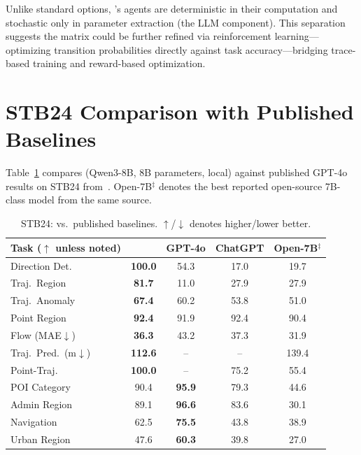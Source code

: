 Unlike standard options, \starname{}'s agents are deterministic in their computation and stochastic only in parameter extraction (the LLM component).  This separation suggests the matrix could be further refined via reinforcement learning---optimizing transition probabilities directly against task accuracy---bridging trace-based training and reward-based optimization.

\FloatBarrier
\section{STB24 Comparison with Published Baselines}
\label{app:published}

Table~\ref{tab:published} compares \starname{} (Qwen3-8B, 8B parameters, local) against published GPT-4o results on STB24 from~\citep{li2025stbench}.
Open-7B$^\ddagger$ denotes the best reported open-source 7B-class model from the same source.

\begin{table}[!htbp]
\centering
\caption{STB24: \starname{} vs.\ published baselines. $\uparrow$/$\downarrow$ denotes higher/lower better.}
\label{tab:published}
\small
\begin{tabular}{lcccc}
\toprule
Task ($\uparrow$ unless noted) & \starname{} & GPT-4o & ChatGPT & Open-7B$^\ddagger$ \\
\midrule
Direction Det.     & \textbf{100.0} & 54.3  & 17.0  & 19.7 \\
Traj.\ Region      & \textbf{81.7}  & 11.0  & 27.9  & 27.9 \\
Traj.\ Anomaly     & \textbf{67.4}  & 60.2  & 53.8  & 51.0 \\
Point Region       & \textbf{92.4}  & 91.9  & 92.4  & 90.4 \\
Flow (MAE$\downarrow$) & \textbf{36.3} & 43.2 & 37.3 & 31.9 \\
Traj.\ Pred.\ (m$\downarrow$) & \textbf{112.6} & --    & --    & 139.4 \\
\midrule
Point-Traj.        & \textbf{100.0} & --    & 75.2  & 55.4 \\
POI Category       & 90.4           & \textbf{95.9} & 79.3 & 44.6 \\
Admin Region       & 89.1           & \textbf{96.6} & 83.6 & 30.1 \\
Navigation         & 62.5           & \textbf{75.5} & 43.8 & 38.9 \\
Urban Region       & 47.6           & \textbf{60.3} & 39.8 & 27.0 \\
\bottomrule
\end{tabular}
\end{table}

